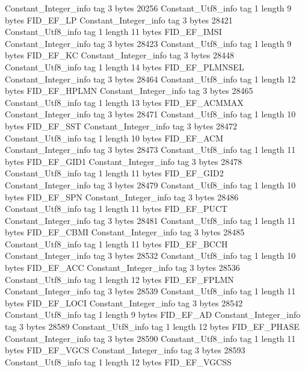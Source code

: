 {{{		}
		Constant_Integer_info {
			tag	3
			bytes	20256
		}
		Constant_Utf8_info {
			tag	1
			length	9
			bytes	FID_EF_LP
		}
		Constant_Integer_info {
			tag	3
			bytes	28421
		}
		Constant_Utf8_info {
			tag	1
			length	11
			bytes	FID_EF_IMSI
		}
		Constant_Integer_info {
			tag	3
			bytes	28423
		}
		Constant_Utf8_info {
			tag	1
			length	9
			bytes	FID_EF_KC
		}
		Constant_Integer_info {
			tag	3
			bytes	28448
		}
		Constant_Utf8_info {
			tag	1
			length	14
			bytes	FID_EF_PLMNSEL
		}
		Constant_Integer_info {
			tag	3
			bytes	28464
		}
		Constant_Utf8_info {
			tag	1
			length	12
			bytes	FID_EF_HPLMN
		}
		Constant_Integer_info {
			tag	3
			bytes	28465
		}
		Constant_Utf8_info {
			tag	1
			length	13
			bytes	FID_EF_ACMMAX
		}
		Constant_Integer_info {
			tag	3
			bytes	28471
		}
		Constant_Utf8_info {
			tag	1
			length	10
			bytes	FID_EF_SST
		}
		Constant_Integer_info {
			tag	3
			bytes	28472
		}
		Constant_Utf8_info {
			tag	1
			length	10
			bytes	FID_EF_ACM
		}
		Constant_Integer_info {
			tag	3
			bytes	28473
		}
		Constant_Utf8_info {
			tag	1
			length	11
			bytes	FID_EF_GID1
		}
		Constant_Integer_info {
			tag	3
			bytes	28478
		}
		Constant_Utf8_info {
			tag	1
			length	11
			bytes	FID_EF_GID2
		}
		Constant_Integer_info {
			tag	3
			bytes	28479
		}
		Constant_Utf8_info {
			tag	1
			length	10
			bytes	FID_EF_SPN
		}
		Constant_Integer_info {
			tag	3
			bytes	28486
		}
		Constant_Utf8_info {
			tag	1
			length	11
			bytes	FID_EF_PUCT
		}
		Constant_Integer_info {
			tag	3
			bytes	28481
		}
		Constant_Utf8_info {
			tag	1
			length	11
			bytes	FID_EF_CBMI
		}
		Constant_Integer_info {
			tag	3
			bytes	28485
		}
		Constant_Utf8_info {
			tag	1
			length	11
			bytes	FID_EF_BCCH
		}
		Constant_Integer_info {
			tag	3
			bytes	28532
		}
		Constant_Utf8_info {
			tag	1
			length	10
			bytes	FID_EF_ACC
		}
		Constant_Integer_info {
			tag	3
			bytes	28536
		}
		Constant_Utf8_info {
			tag	1
			length	12
			bytes	FID_EF_FPLMN
		}
		Constant_Integer_info {
			tag	3
			bytes	28539
		}
		Constant_Utf8_info {
			tag	1
			length	11
			bytes	FID_EF_LOCI
		}
		Constant_Integer_info {
			tag	3
			bytes	28542
		}
		Constant_Utf8_info {
			tag	1
			length	9
			bytes	FID_EF_AD
		}
		Constant_Integer_info {
			tag	3
			bytes	28589
		}
		Constant_Utf8_info {
			tag	1
			length	12
			bytes	FID_EF_PHASE
		}
		Constant_Integer_info {
			tag	3
			bytes	28590
		}
		Constant_Utf8_info {
			tag	1
			length	11
			bytes	FID_EF_VGCS
		}
		Constant_Integer_info {
			tag	3
			bytes	28593
		}
		Constant_Utf8_info {
			tag	1
			length	12
			bytes	FID_EF_VGCSS
}}}
